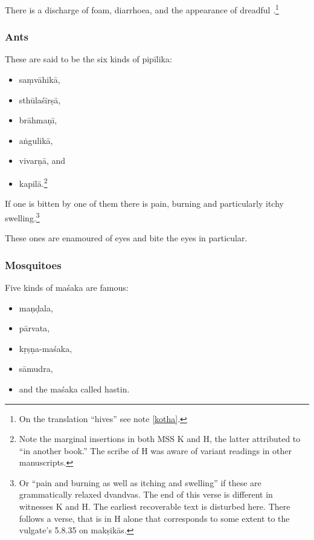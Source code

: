 \begin{translation}
There is a discharge of foam, diarrhoea, and the appearance of 
dreadful .\footnote{On the translation “hives” see
    note \ref{kotha}.} 
    
    \subsubsection{Ants}
    
    These are said to be the six kinds of \gls{pipīlika}: 
    \begin{itemize}
        \item \Gls{saṃvāhikā}, 
        \item \Gls{sthūlaśīrṣā}, 
        \item \Gls{brāhmaṇī}, 
        \item \Gls{aṅgulikā},
        \item \Gls{vivarṇā}, and 
        \item \Gls{kapilā}.\footnote{Note the marginal insertions in both
            MSS K and H, the latter attributed to  “in another
            book.” The scribe of H was aware of variant readings in other
            manuscripts. }    
    \end{itemize}
If one is bitten by one of them there is pain, burning and particularly 
itchy swelling.\footnote{Or “pain and burning as well as itching
        and swelling” if these are grammatically relaxed dvandvas. The end of
        this verse is different in witnesses K and H.  The earliest
        recoverable text is disturbed here.  There follows a verse, 
         that is in H alone that corresponds to some extent to 
        the vulgate's 5.8.35 on \glspl{makṣikā}.}
        
These ones are enamoured of eyes and bite the eyes in particular.
    
    \subsubsection{Mosquitoes}
    
\item[36 verses 1--3]

Five kinds of \gls{maśaka} are famous:
\begin{itemize}
    \item \Gls{maṇḍala},
    \item \Gls{pārvata},
    \item \Gls{kṛṣṇa-maśaka},
    \item \Gls{sāmudra}, 
    \item and the \gls{maśaka} called \Gls{hastin}.
\end{itemize}


\end{translation}
